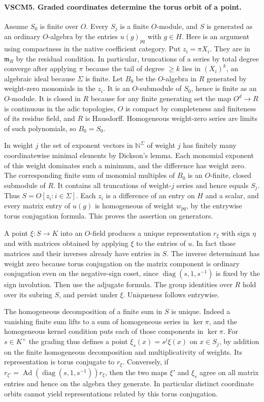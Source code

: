 \paragraph{VSCM5. Graded coordinates determine the torus orbit of a point.}
\label{claim:VSCM5}
Assume $S_0$ is finite over $O$. Every $S_j$ is a finite $O$-module,
and $S$ is generated as an ordinary $O$-algebra by the entries
$u(g)_{pq}$ with $g\in H$. Here is an argument using compactness
in the native coefficient category. Put $z_i=\pi X_i$. They are in
$\mathfrak m_R$ by the residual condition. In particular, truncations
of a series by total degree converge after applying $\pi$ because the tail of
degree $\ge k$ lies in $(X_i)^k$, an algebraic ideal because $\Sigma$
is finite. Let $B_0$ be the $O$-algebra in $R$ generated by weight-zero
monomials in the $z_i$. It is an $O$-submodule of $S_0$, hence is
finite as an $O$-module. It is closed in $R$ because for any finite generating
set the map $O^d\to R$ is continuous in the adic topologies, $O$ is
compact by completeness and finiteness of its residue field, and $R$
is Hausdorff. Homogeneous weight-zero series are limits of such
polynomials, so $B_0=S_0$.

In weight $j$ the set of exponent vectors in $\mathbb N^\Sigma$ of
weight $j$ has finitely many coordinatewise minimal elements by
Dickson's lemma. Each monomial exponent of this weight dominates such
a minimum, and the difference has weight zero. The corresponding
finite sum of monomial multiples of $B_0$ is an $O$-finite, closed
submodule of $R$. It contains all truncations of weight-$j$ series
and hence equals $S_j$. Thus $S=O[z_i:i\in\Sigma]$. Each $z_i$ is
a difference of an entry on $H$ and a scalar, and every matrix entry
of $u(g)$ is homogeneous of weight $w_{pq}$, by the entrywise torus
conjugation formula. This proves the assertion on generators.

A point $\xi:S\to K$ into an $O$-field produces a unique representation
$r_\xi$ with sign $\eta$ and with matrices obtained by applying $\xi$
to the entries of $u$. In fact those matrices and their inverses
already have entries in $S$. The inverse determinant has weight zero because
torus conjugation on the matrix component is ordinary conjugation
even on the negative-sign coset, since $\operatorname{diag}(s,1,s^{-1})$
is fixed by the sign involution. Then use the adjugate formula.
The group identities over $R$ hold over its subring $S$, and persist
under $\xi$. Uniqueness follows entrywise.

The homogeneous decomposition of a finite sum in $S$ is unique.
Indeed a vanishing finite sum lifts to a sum of homogeneous series
in $\ker\pi$, and the homogeneous kernel condition puts each of those
components in $\ker\pi$. For $s\in K^\times$ the grading thus defines a point
$\xi_s(x)=s^j\xi(x)$ on $x\in S_j$, by addition on the finite
homogeneous decomposition and multiplicativity of weights.
Its representation is torus conjugate to $r_\xi$. Conversely, if
$r_{\xi'}=\operatorname{Ad}(\operatorname{diag}(s,1,s^{-1}))r_\xi$,
then the two maps $\xi'$ and $\xi_s$ agree on all matrix entries and
hence on the algebra they generate. In particular distinct coordinate
orbits cannot yield representations related by this torus conjugation.

